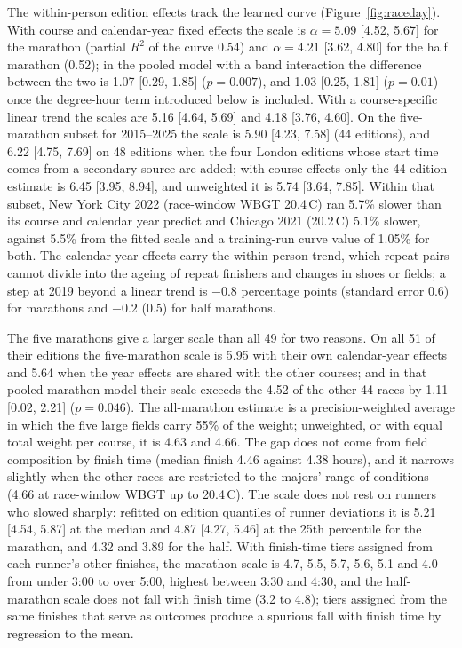 \documentclass[11pt]{article}
\renewcommand{\_}{\textunderscore\allowbreak}
\begin{document}
The within-person edition effects track the learned curve (Figure~\ref{fig:raceday}). With course and calendar-year fixed effects the scale is $\alpha = 5.09$ [4.52, 5.67] for the marathon (partial $R^2$ of the curve 0.54) and $\alpha = 4.21$ [3.62, 4.80] for the half marathon (0.52); in the pooled model with a band interaction the difference between the two is 1.07 [0.29, 1.85] ($p = 0.007$), and 1.03 [0.25, 1.81] ($p = 0.01$) once the degree-hour term introduced below is included. With a course-specific linear trend the scales are 5.16 [4.64, 5.69] and 4.18 [3.76, 4.60]. On the five-marathon subset for 2015--2025 the scale is 5.90 [4.23, 7.58] (44 editions), and 6.22 [4.75, 7.69] on 48 editions when the four London editions whose start time comes from a secondary source are added; with course effects only the 44-edition estimate is 6.45 [3.95, 8.94], and unweighted it is 5.74 [3.64, 7.85]. Within that subset, New York City 2022 (race-window WBGT 20.4\,\textdegree C) ran 5.7\% slower than its course and calendar year predict and Chicago 2021 (20.2\,\textdegree C) 5.1\% slower, against 5.5\% from the fitted scale and a training-run curve value of 1.05\% for both. The calendar-year effects carry the within-person trend, which repeat pairs cannot divide into the ageing of repeat finishers and changes in shoes or fields; a step at 2019 beyond a linear trend is $-0.8$ percentage points (standard error 0.6) for marathons and $-0.2$ (0.5) for half marathons.

The five marathons give a larger scale than all 49 for two reasons. On all 51 of their editions the five-marathon scale is 5.95 with their own calendar-year effects and 5.64 when the year effects are shared with the other courses; and in that pooled marathon model their scale exceeds the 4.52 of the other 44 races by 1.11 [0.02, 2.21] ($p = 0.046$). The all-marathon estimate is a precision-weighted average in which the five large fields carry 55\% of the weight; unweighted, or with equal total weight per course, it is 4.63 and 4.66. The gap does not come from field composition by finish time (median finish 4.46 against 4.38 hours), and it narrows slightly when the other races are restricted to the majors' range of conditions (4.66 at race-window WBGT up to 20.4\,\textdegree C). The scale does not rest on runners who slowed sharply: refitted on edition quantiles of runner deviations it is 5.21 [4.54, 5.87] at the median and 4.87 [4.27, 5.46] at the 25th percentile for the marathon, and 4.32 and 3.89 for the half. With finish-time tiers assigned from each runner's other finishes, the marathon scale is 4.7, 5.5, 5.7, 5.6, 5.1 and 4.0 from under 3:00 to over 5:00, highest between 3:30 and 4:30, and the half-marathon scale does not fall with finish time (3.2 to 4.8); tiers assigned from the same finishes that serve as outcomes produce a spurious fall with finish time by regression to the mean.
\end{document}
